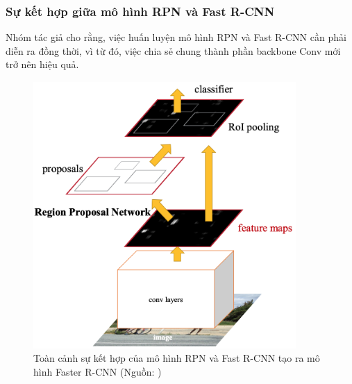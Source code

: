 {    \subsubsection*{Sự kết hợp giữa mô hình RPN và Fast R-CNN}
    Nhóm tác giả cho rằng, việc huấn luyện mô hình RPN và Fast R-CNN cần phải diễn ra đồng thời, vì từ đó, việc chia sẻ chung thành phần backbone Conv mới trở nên hiệu quả.

    \begin{figure}[H]
        \centering
        \includegraphics[width=10cm] {images/faster_rcnn_model}
        \caption{Toàn cảnh sự kết hợp của mô hình RPN và Fast R-CNN tạo ra mô hình Faster R-CNN (Nguồn: \cite{ren2015faster})}
        \label{fig:faster_model}
    \end{figure}

}
